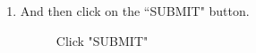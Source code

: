 \documentclass[ManualeUtente]{subfiles}
\begin{document}
\begin{enumerate}
		\item And then click on the \textquotedblleft SUBMIT" button.
		\begin{figure}[H]
			\centering
			\caption{Click "SUBMIT"}
			\label{fig:Click "SUBMIT"}
		\end{figure}
	\end{enumerate}
	\newpage
\end{document}
